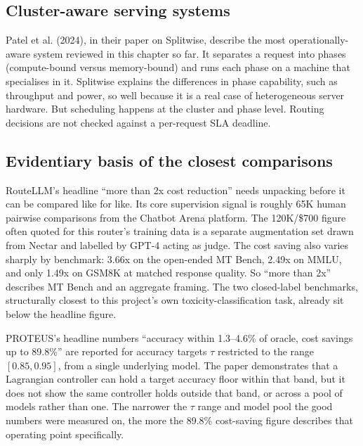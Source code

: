 \hypertarget{cluster-aware-serving-systems}{%
\subsection{Cluster-aware serving
systems}\label{cluster-aware-serving-systems}}

Patel et al. (2024), in their paper on Splitwise, describe the most
operationally-aware system reviewed in this chapter so far. It
separates a request into phases (compute-bound versus memory-bound) and
runs each phase on a machine that specialises in it. Splitwise explains
the differences in phase capability, such as throughput and power, so
well because it is a real case of heterogeneous server hardware. But
scheduling happens at the cluster and phase level. Routing decisions
are not checked against a per-request SLA deadline.

\hypertarget{evidentiary-basis-of-the-closest-comparisons}{%
\subsection{Evidentiary basis of the closest
comparisons}\label{evidentiary-basis-of-the-closest-comparisons}}

RouteLLM's headline ``more than 2x cost reduction'' needs unpacking
before it can be compared like for like. Its core supervision signal is
roughly 65K human pairwise comparisons from the Chatbot Arena platform.
The 120K/\$700 figure often quoted for this router's training data is a
separate augmentation set drawn from Nectar and labelled by GPT-4 acting
as judge. The cost saving also varies sharply by benchmark: 
3.66x on the open-ended MT Bench, 2.49x on MMLU, and only 
1.49x on GSM8K at matched response quality. So ``more than 2x'' 
describes MT Bench and an aggregate framing. The two closed-label 
benchmarks, structurally closest to this project's own 
toxicity-classification task, already sit below the headline figure.

PROTEUS's headline numbers ``accuracy within 1.3--4.6\% of oracle, cost
savings up to 89.8\%'' are reported for accuracy targets $\tau$
restricted to the range $[0.85, 0.95]$, from a single underlying model.
The paper demonstrates that a Lagrangian controller can hold a target
accuracy floor within that band, but it does not show the same
controller holds outside that band, or across a pool of models rather
than one. The narrower the $\tau$ range and model pool the good numbers were
measured on, the more the 89.8\% cost-saving figure describes that
operating point specifically.

